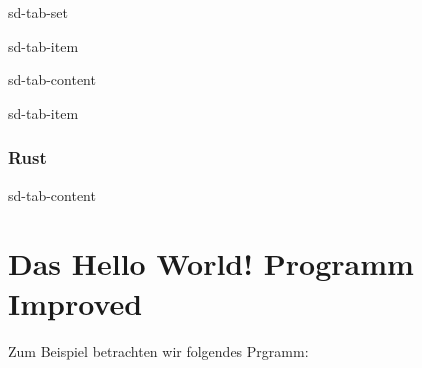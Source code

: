 \documentclass[letterpaper,10pt,english]{jupyterBook}
\begin{document}
\begin{sphinxuseclass}{sd-tab-set}
\begin{sphinxuseclass}{sd-tab-item}
\begin{sphinxuseclass}{sd-tab-content}
\begin{sphinxVerbatim}[commandchars=\\\{\}]
 
\PYG{o}{[}\PYG{o}{]}
\end{sphinxVerbatim}

\end{sphinxuseclass}
\end{sphinxuseclass}
\begin{sphinxuseclass}{sd-tab-item}\subsubsection*{Rust}

\begin{sphinxuseclass}{sd-tab-content}
\begin{sphinxVerbatim}[commandchars=\\\{\}]
 
\end{sphinxVerbatim}

\end{sphinxuseclass}
\end{sphinxuseclass}
\end{sphinxuseclass}

\section{Das Hello World! \sphinxhyphen{} Programm Improved}
\label{\detokenize{Notebooks/Hello World!:das-hello-world-programm-improved}}
\sphinxAtStartPar
Zum Beispiel betrachten wir folgendes Prgramm:
\end{document}
